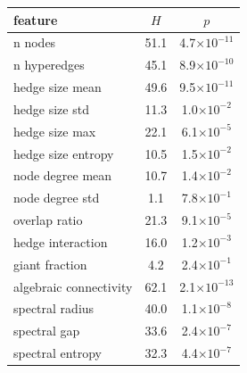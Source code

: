 \begin{tabular}{lcc}
\toprule
feature & $H$ & $p$ \\
\midrule
n nodes & 51.1 & 4.7$\times10^{-11}$ \\
n hyperedges & 45.1 & 8.9$\times10^{-10}$ \\
hedge size mean & 49.6 & 9.5$\times10^{-11}$ \\
hedge size std & 11.3 & 1.0$\times10^{-2}$ \\
hedge size max & 22.1 & 6.1$\times10^{-5}$ \\
hedge size entropy & 10.5 & 1.5$\times10^{-2}$ \\
node degree mean & 10.7 & 1.4$\times10^{-2}$ \\
node degree std & 1.1 & 7.8$\times10^{-1}$ \\
overlap ratio & 21.3 & 9.1$\times10^{-5}$ \\
hedge interaction & 16.0 & 1.2$\times10^{-3}$ \\
giant fraction & 4.2 & 2.4$\times10^{-1}$ \\
algebraic connectivity & 62.1 & 2.1$\times10^{-13}$ \\
spectral radius & 40.0 & 1.1$\times10^{-8}$ \\
spectral gap & 33.6 & 2.4$\times10^{-7}$ \\
spectral entropy & 32.3 & 4.4$\times10^{-7}$ \\
\bottomrule
\end{tabular}
